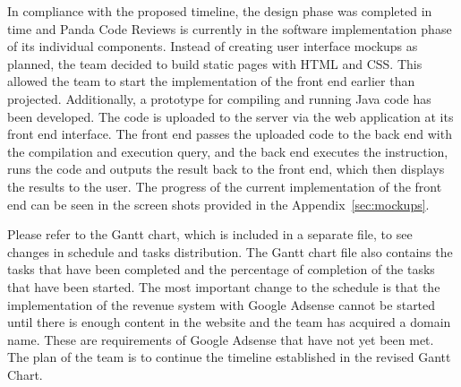 





In compliance with the proposed timeline, the design phase was completed in time
and Panda Code Reviews is currently in the software implementation phase of its
individual components. Instead of creating user interface mockups as planned,
the team decided to build static pages with HTML and CSS. This allowed the team
to start the implementation of the front end earlier than projected.
Additionally, a prototype for compiling and running Java code has been
developed. The code is uploaded to the server via the web application at its
front end interface. The front end passes the uploaded code to the back end with
the compilation and execution query, and the back end executes the instruction,
runs the code and outputs the result back to the front end, which then displays
the results to the user. The progress of the current implementation of the front
end can be seen in the screen shots provided in the Appendix~\ref{sec:mockups}.

Please refer to the Gantt chart, which is included in a separate file, to see
changes in schedule and tasks distribution. The Gantt chart file also contains
the tasks that have been completed and the percentage of completion of the tasks
that have been started. The most important change to the schedule is that the
implementation of the revenue system with Google Adsense cannot be started until
there is enough content in the website and the team has acquired a domain name.
These are requirements of Google Adsense that have not yet been met. The plan of
the team is to continue the timeline established in the revised Gantt Chart.
